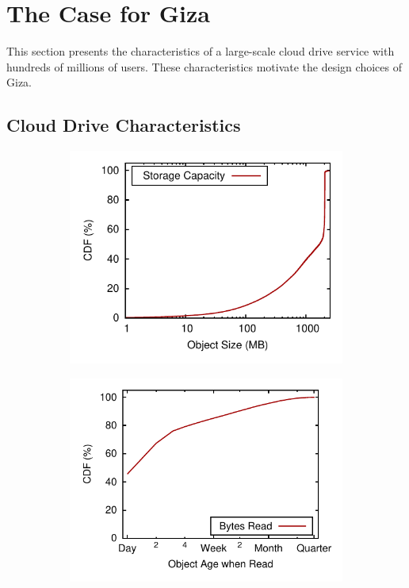 \section{The Case for Giza}
\label{sec:motivation}

This section presents the characteristics of a large-scale cloud drive service with hundreds of millions of users. These characteristics motivate the design choices of Giza.

\subsection{Cloud Drive Characteristics}

\begin{figure}[tp]
\hspace{-4em}
\begin{subfigure}{.3\textwidth}
  \centering
  \includegraphics[width=\linewidth]{data/object_size-storage_capacity}
  \caption{}
  \label{fig:object_size-storage_capacity}
\end{subfigure}%
\begin{subfigure}{.3\textwidth}
  \centering
  \includegraphics[width=\linewidth]{data/write_read_gap-bytes_read}

\end{subfigure}
\end{figure}

